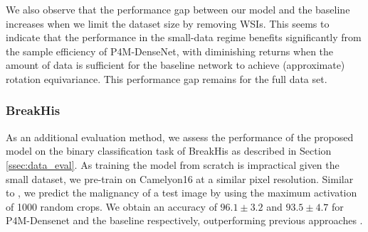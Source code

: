 \documentclass{llncs}
\begin{document}
We also observe that the performance gap between our model and the baseline increases when we limit the dataset size by removing WSIs. This seems to indicate that the performance in the small-data regime benefits significantly from the sample efficiency of P4M-DenseNet, with diminishing returns when the amount of data is sufficient for the baseline network to achieve (approximate) rotation equivariance. This performance gap remains for the full data set.






\subsubsection{BreakHis} 
As an additional evaluation method, we assess the performance of the proposed model on the binary classification task of BreakHis as described in Section \ref{ssec:data_eval}. As training the model from scratch is impractical given the small dataset, we pre-train on Camelyon16 at a similar pixel resolution. Similar to \cite{Spanhol2016-dm}, we predict the malignancy of a test image by using the maximum activation of 1000 random crops. We obtain an accuracy of $96.1\pm3.2$ and $93.5\pm4.7$ for P4M-Densenet and the baseline respectively, outperforming previous approaches \cite{Spanhol2016-dm}\cite{Songyang}. 










    
    
    



    




















    
\end{document}
